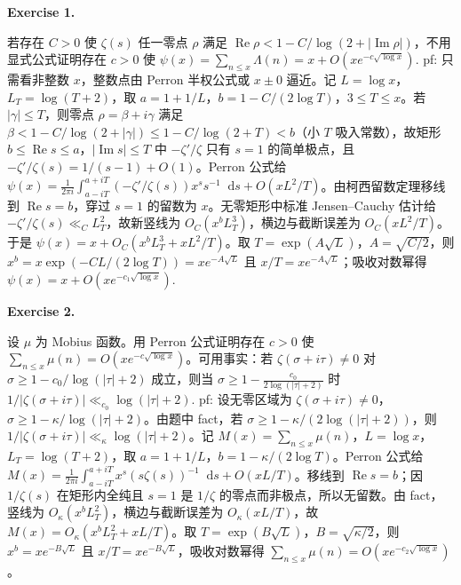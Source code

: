 \documentclass[
	colors = true,
	geometry = a4,
	fontsetup = font-setup-overleaf.tex,
	titlesetup = titles-setup.tex
]{AJbook}
\newenvironment{sheetexercise}[1]{%
	\par\addvspace{0.03\baselineskip}
	\begingroup\color{problemblue}%
	\noindent\textbf{Exercise #1.}\enspace
}{%
	\unskip\enspace
	\endgroup
}
\newenvironment{solution}{%
	\textit{Solution.}\enspace
}{%
	\par\addvspace{0.02\baselineskip}
}
\providecommand{\dd}{\mathop{}\!\mathrm d}
\begin{document}
\begingroup
\renewenvironment{solution}{%
	\ignorespaces
}{%
	\par\addvspace{0.02\baselineskip}
}

\begin{sheetexercise}{1}
若存在 $C>0$ 使 $\zeta(s)$ 任一零点 $\rho$ 满足 $\operatorname{Re}\rho<1-C/\log(2+|\operatorname{Im}\rho|)$，不用显式公式证明存在 $c>0$ 使 $\psi(x)=\sum_{n\leq x}\Lambda(n)=x+O(xe^{-c\sqrt{\log x}})$.
\end{sheetexercise}
\begin{solution}pf: 只需看非整数 $x$，整数点由 Perron 半权公式或 $x\pm0$ 逼近。记 $L=\log x$，$L_T=\log(T+2)$，取 $a=1+1/L$，$b=1-C/(2\log T)$，$3\leq T\leq x$。若 $|\gamma|\leq T$，则零点 $\rho=\beta+i\gamma$ 满足 $\beta<1-C/\log(2+|\gamma|)\leq1-C/\log(2+T)<b$（小 $T$ 吸入常数），故矩形 $b\leq\operatorname{Re}s\leq a$，$|\operatorname{Im}s|\leq T$ 中 $-\zeta'/\zeta$ 只有 $s=1$ 的简单极点，且 $-\zeta'/\zeta(s)=1/(s-1)+O(1)$。Perron 公式给 $\psi(x)=\frac1{2\pi i}\int_{a-iT}^{a+iT}(-\zeta'/\zeta(s))x^s s^{-1}\dd s+O(xL^2/T)$。由柯西留数定理移线到 $\operatorname{Re}s=b$，穿过 $s=1$ 的留数为 $x$。无零矩形中标准 Jensen--Cauchy 估计给 $-\zeta'/\zeta(s)\ll_C L_T^2$，故新竖线为 $O_C(x^bL_T^3)$，横边与截断误差为 $O_C(xL^2/T)$。于是 $\psi(x)=x+O_C(x^bL_T^3+xL^2/T)$。取 $T=\exp(A\sqrt L)$，$A=\sqrt{C/2}$，则 $x^b=x\exp(-CL/(2\log T))=xe^{-A\sqrt L}$ 且 $x/T=xe^{-A\sqrt L}$；吸收对数幂得 $\psi(x)=x+O(xe^{-c_1\sqrt{\log x}})$.\end{solution}

\begin{sheetexercise}{2}
设 $\mu$ 为 Mobius 函数。用 Perron 公式证明存在 $c>0$ 使 $\sum_{n\leq x}\mu(n)=O(xe^{-c\sqrt{\log x}})$。可用事实：若 $\zeta(\sigma+i\tau)\neq0$ 对 $\sigma\geq1-c_0/\log(|\tau|+2)$ 成立，则当 $\sigma\geq1-\frac{c_0}{2\log(|\tau|+2)}$ 时 $1/|\zeta(\sigma+i\tau)|\ll_{c_0}\log(|\tau|+2)$.
\end{sheetexercise}
\begin{solution}pf: 设无零区域为 $\zeta(\sigma+i\tau)\neq0$，$\sigma\geq1-\kappa/\log(|\tau|+2)$。由题中 fact，若 $\sigma\geq1-\kappa/(2\log(|\tau|+2))$，则 $1/|\zeta(\sigma+i\tau)|\ll_\kappa\log(|\tau|+2)$。记 $M(x)=\sum_{n\leq x}\mu(n)$，$L=\log x$，$L_T=\log(T+2)$，取 $a=1+1/L$，$b=1-\kappa/(2\log T)$。Perron 公式给 $M(x)=\frac1{2\pi i}\int_{a-iT}^{a+iT}x^s(s\zeta(s))^{-1}\dd s+O(xL/T)$。移线到 $\operatorname{Re}s=b$；因 $1/\zeta(s)$ 在矩形内全纯且 $s=1$ 是 $1/\zeta$ 的零点而非极点，所以无留数。由 fact，竖线为 $O_\kappa(x^bL_T^2)$，横边与截断误差为 $O_\kappa(xL/T)$，故 $M(x)=O_\kappa(x^bL_T^2+xL/T)$。取 $T=\exp(B\sqrt L)$，$B=\sqrt{\kappa/2}$，则 $x^b=xe^{-B\sqrt L}$ 且 $x/T=xe^{-B\sqrt L}$，吸收对数幂得 $\sum_{n\leq x}\mu(n)=O(xe^{-c_2\sqrt{\log x}})$。\end{solution}
\end{document}
